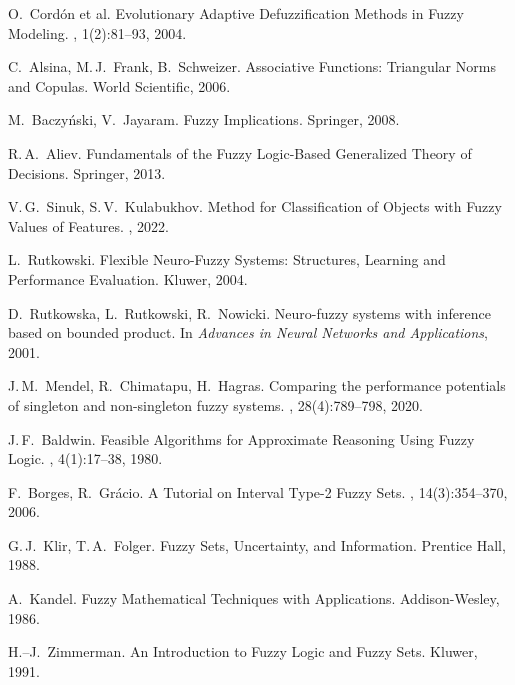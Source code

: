 \begin{thebibliography}{200}
O.~Cordón et al.
\newblock Evolutionary Adaptive Defuzzification Methods in Fuzzy Modeling.
, 1(2):81–93, 2004.

C.~Alsina, M.\,J.~Frank, B.~Schweizer.
\newblock Associative Functions: Triangular Norms and Copulas.
\newblock World Scientific, 2006.

M.~Baczyński, V.~Jayaram.
\newblock Fuzzy Implications.
\newblock Springer, 2008.

R.\,A.~Aliev.
\newblock Fundamentals of the Fuzzy Logic-Based Generalized Theory of Decisions.
\newblock Springer, 2013.

V.\,G.~Sinuk, S.\,V.~Kulabukhov.
\newblock Method for Classification of Objects with Fuzzy Values of Features.
, 2022.

L.~Rutkowski.
\newblock Flexible Neuro-Fuzzy Systems: Structures, Learning and Performance Evaluation.
\newblock Kluwer, 2004.

D.~Rutkowska, L.~Rutkowski, R.~Nowicki.
\newblock Neuro-fuzzy systems with inference based on bounded product.
\newblock In {\em Advances in Neural Networks and Applications}, 2001.

J.\,M.~Mendel, R.~Chimatapu, H.~Hagras.
\newblock Comparing the performance potentials of singleton and non-singleton fuzzy systems.
, 28(4):789–798, 2020.

J.\,F.~Baldwin.
\newblock Feasible Algorithms for Approximate Reasoning Using Fuzzy Logic.
, 4(1):17–38, 1980.

F.~Borges, R.~Grácio.
\newblock A Tutorial on Interval Type-2 Fuzzy Sets.
, 14(3):354–370, 2006.

G.\,J.~Klir, T.\,A.~Folger.
\newblock Fuzzy Sets, Uncertainty, and Information.
\newblock Prentice Hall, 1988.

A.~Kandel.
\newblock Fuzzy Mathematical Techniques with Applications.
\newblock Addison-Wesley, 1986.

H.--J.~Zimmerman.
\newblock An Introduction to Fuzzy Logic and Fuzzy Sets.
\newblock Kluwer, 1991.


\end{thebibliography}
